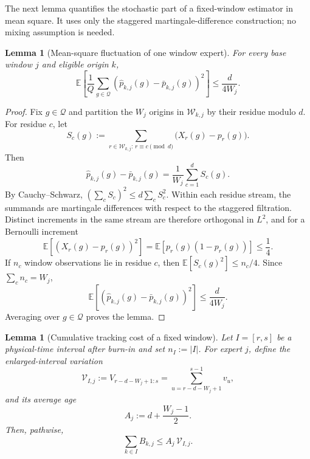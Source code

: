 \documentclass[11pt]{article}
\newtheorem{lemma}[theorem]{Lemma}
\newcommand{\E}{\mathbb{E}}
\newcommand{\Q}{\mathcal{Q}}
\newcommand{\1}{\mathbf{1}}
\begin{document}
The next lemma quantifies the stochastic part of a fixed-window estimator in
mean square.  It uses only the staggered martingale-difference construction;
no mixing assumption is needed.

\begin{lemma}[Mean-square fluctuation of one window expert]
\label{lem:window-mse-fluctuation}
For every base window $j$ and eligible origin $k$,
\begin{equation}
    \E\!\left[
        \frac1Q
        \sum_{g\in\Q}
        \left(
            \widehat p_{k,j}(g)-\bar p_{k,j}(g)
        \right)^2
    \right]
    \le
    \frac{d}{4W_j}.
    \label{eq:window-mse-fluctuation}
\end{equation}
\end{lemma}

\begin{proof}
Fix $g\in\Q$ and partition the $W_j$ origins in
$\mathcal W_{k,j}$ by their residue modulo $d$.  For residue $c$, let
\[
    S_c(g)
    :=
    \sum_{r\in\mathcal W_{k,j}:\,r\equiv c\!\!\pmod d}
    \bigl(X_r(g)-p_r(g)\bigr).
\]
Then
\[
    \widehat p_{k,j}(g)-\bar p_{k,j}(g)
    =
    \frac1{W_j}\sum_{c=1}^d S_c(g).
\]
By Cauchy--Schwarz,
$\left(\sum_c S_c\right)^2\le d\sum_c S_c^2$.  Within each residue stream,
the summands are martingale differences with respect to the staggered
filtration.  Distinct increments in the same stream are therefore orthogonal
in $L^2$, and for a Bernoulli increment
\[
    \E[(X_r(g)-p_r(g))^2]
    =
    \E[p_r(g)(1-p_r(g))]
    \le \frac14.
\]
If $n_c$ window observations lie in residue $c$, then
$\E[S_c(g)^2]\le n_c/4$.  Since $\sum_c n_c=W_j$,
\[
    \E\!\left[
        (\widehat p_{k,j}(g)-\bar p_{k,j}(g))^2
    \right]
    \le
    \frac{d}{4W_j}.
\]
Averaging over $g\in\Q$ proves the lemma.
\end{proof}

\begin{lemma}[Cumulative tracking cost of a fixed window]
\label{lem:cumulative-window-variation}
Let $I=[r,s]$ be a physical-time interval after burn-in and set
$n_I:=|I|$.  For expert $j$, define the enlarged-interval variation
\begin{equation}
    \mathcal V_{I,j}
    :=
    V_{r-d-W_j+1:s}
    =
    \sum_{u=r-d-W_j+1}^{s-1}v_u,
    \label{eq:expanded-variation-budget}
\end{equation}
and its average age
\[
    A_j
    :=
    d+\frac{W_j-1}{2}.
\]
Then, pathwise,
\begin{equation}
\boxed{
    \sum_{k\in I} B_{k,j}
    \le
    A_j\,\mathcal V_{I,j}.
}
\label{eq:cumulative-window-tracking}
\end{equation}
\end{lemma}
\end{document}
